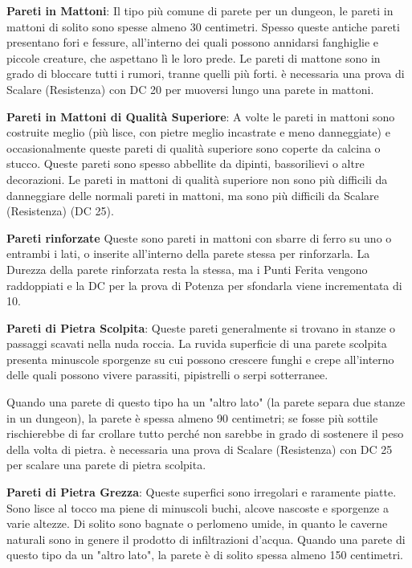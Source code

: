 \documentclass[a4paper,11pt,twoside,openany]{book}
\begin{document}
{\bigskip
 
\textbf{Pareti in Mattoni}: Il tipo più comune di parete per un dungeon, le pareti in mattoni di solito sono spesse almeno 30 centimetri. Spesso queste antiche pareti presentano fori e fessure, all'interno dei quali possono annidarsi fanghiglie e piccole creature, che aspettano lì le loro prede. Le pareti di mattone sono in grado di bloccare tutti i rumori, tranne quelli più forti. è necessaria una prova di Scalare (Resistenza) con DC 20 per muoversi lungo una parete in mattoni.

\textbf{Pareti in Mattoni di Qualità Superiore}: A volte le pareti in mattoni sono costruite meglio (più lisce, con pietre meglio incastrate e meno danneggiate) e occasionalmente queste pareti di qualità superiore sono coperte da calcina o stucco. Queste pareti sono spesso abbellite da dipinti, bassorilievi o altre decorazioni. Le pareti in mattoni di qualità superiore non sono più difficili da danneggiare delle normali pareti in mattoni, ma sono più difficili da Scalare (Resistenza) (DC 25).

\textbf{Pareti rinforzate} Queste sono pareti in mattoni con sbarre di ferro su uno o entrambi i lati, o inserite all’interno della parete stessa per rinforzarla. La Durezza della parete rinforzata resta la stessa, ma i Punti Ferita vengono raddoppiati e la DC per la prova di Potenza per sfondarla viene incrementata di 10.

\textbf{Pareti di Pietra Scolpita}: Queste pareti generalmente si trovano in stanze o passaggi scavati nella nuda roccia. La ruvida superficie di una parete scolpita presenta minuscole sporgenze su cui possono crescere funghi e crepe all'interno delle quali possono vivere parassiti, pipistrelli o serpi sotterranee. 

Quando una parete di questo tipo ha un "altro lato" (la parete separa due stanze in un dungeon), la parete è spessa almeno 90 centimetri; se fosse più sottile rischierebbe di far crollare tutto perché non sarebbe in grado di sostenere il peso della volta di pietra. è necessaria una prova di Scalare (Resistenza) con DC 25 per scalare una parete di pietra scolpita.

\textbf{Pareti di Pietra Grezza}: Queste superfici sono irregolari e raramente piatte. Sono lisce al tocco ma piene di minuscoli buchi, alcove nascoste e sporgenze a varie altezze. Di solito sono bagnate o perlomeno umide, in quanto le caverne naturali sono in genere il prodotto di infiltrazioni d'acqua. Quando una parete di questo tipo da un "altro lato", la parete è di solito spessa almeno 150 centimetri.

}
\end{document}

